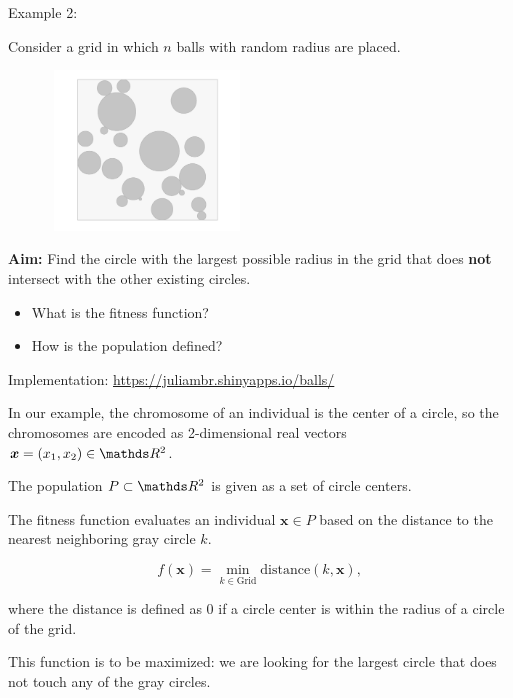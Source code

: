 \documentclass[11pt,compress,t,notes=noshow, xcolor=table]{beamer}
\begin{document}
\begin{vbframe}{Example 2:}

Consider a grid in which $n$ balls with random radius are placed.
\begin{center}
\begin{figure}
  \includegraphics[height = 4.25cm, width = 5.25cm]{figure_man/grid.png}
\end{figure}
\end{center}


\textbf{Aim:} Find the circle with the largest possible radius in the grid that does \textbf{not} intersect with the other existing circles.

\begin{itemize}
\item What is the fitness function?
\item How is the population defined?
\end{itemize}

Implementation: \url{https://juliambr.shinyapps.io/balls/}

\framebreak

In our example, the chromosome of an individual is the center of a circle, so the chromosomes are encoded as 2-dimensional real vectors $\bm{x} = (x_1, x_2) \in \R^2$.

\lz

The population $P \subset \R^2$ is given as a set of circle centers.

\lz

The fitness function evaluates an individual $\bm{x} \in P$ based on the distance to the nearest neighboring gray circle $k$.

$$
f(\bm{x}) = \min_{k \in \text{Grid}} \text{distance} (k, \bm{x}),
$$

where the distance is defined as $0$ if a circle center is within the radius of a circle of the grid.

This function is to be maximized: we are looking for the largest circle that does not touch any of the gray circles.

\end{vbframe}
\end{document}
